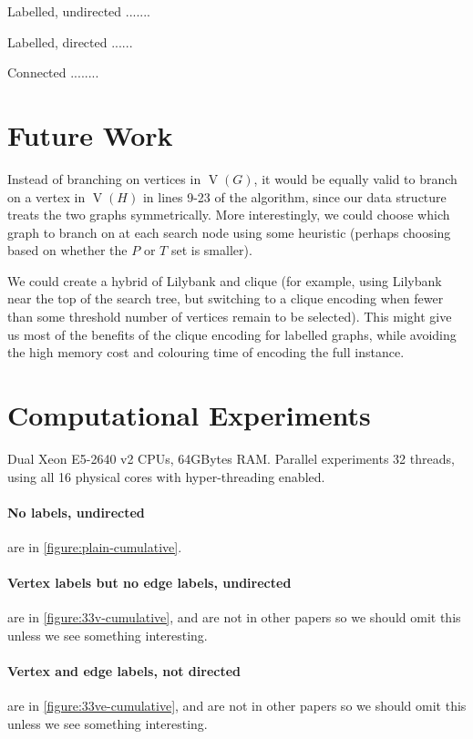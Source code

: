 \documentclass[letterpaper]{article}
\DeclareMathOperator{\V}{V}
\begin{document}
Labelled, undirected .......

Labelled, directed ......

Connected ........

\section{Future Work}

Instead of branching on vertices in $\V(G)$, it would be equally valid to branch on
a vertex in $\V(H)$ in lines 9-23 of the algorithm, since our data structure treats the
two graphs symmetrically. More interestingly, we could choose which graph to branch on
at each search node using some heuristic (perhaps choosing based on whether the $P$ or
$T$ set is smaller).

We could create a hybrid of Lilybank and clique (for example, using Lilybank near the
top of the search tree, but switching to a clique encoding when fewer than some threshold
number of vertices remain to be selected). This might give us most of the benefits of
the clique encoding for labelled graphs, while avoiding the high memory cost and colouring
time of encoding the full instance.

\section{Computational Experiments}

Dual Xeon E5-2640 v2 CPUs, 64GBytes RAM. Parallel experiments 32 threads, using
all 16 physical cores with hyper-threading enabled.

\paragraph{No labels, undirected} are in \cref{figure:plain-cumulative}.

\paragraph{Vertex labels but no edge labels, undirected} are in \cref{figure:33v-cumulative}, and are not in other papers so we should omit this unless we see something interesting.

\paragraph{Vertex and edge labels, not directed} are in \cref{figure:33ve-cumulative}, and are not in other papers so we should omit this unless we see something interesting.
\end{document}
